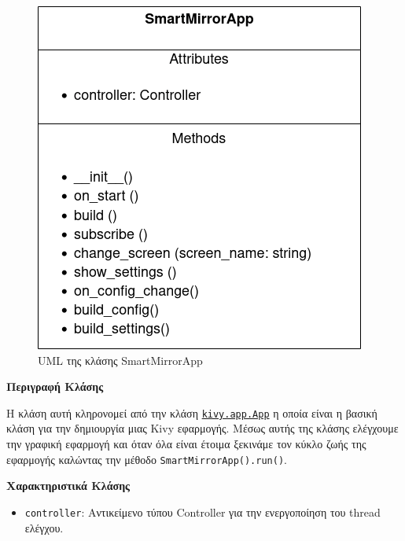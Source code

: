 \begin{figure}[h]
    \centering
    \includegraphics[scale=0.7]{images/chapter4/uml_diagrams/SmartMirrorApp.png}
    \caption{UML της κλάσης SmartMirrorApp}
    \label{fig:smartmirrorapp}
\end{figure}
\noindent\textbf{Περιγραφή Κλάσης}

Η κλάση αυτή κληρονομεί από την κλάση \href{https://kivy.org/doc/stable/api-kivy.app.html\#kivy.app.App}{\texttt{kivy.app.App}} η οποία είναι η βασική κλάση για την δημιουργία μιας Kivy εφαρμογής. Μέσως αυτής της κλάσης ελέγχουμε την γραφική εφαρμογή και όταν όλα είναι έτοιμα ξεκινάμε τον κύκλο ζωής της εφαρμογής καλώντας την μέθοδο \texttt{SmartMirrorApp().run()}.

\noindent\textbf{Χαρακτηριστικά Κλάσης}
\begin{itemize}
    \item \texttt{controller}: Αντικείμενο τύπου Controller για την ενεργοποίηση του thread ελέγχου.
\end{itemize}

